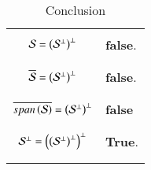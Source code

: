 \begin{longtable}{|c|l|}
    \hline
	\multirow{3}{*}{$\mathcal{S}=\left(\mathcal{S}^{\perp}\right)^{\perp}$} 
	& \\
	&\textbf{false}.\\
	&\\
	\hline
    \multirow{3}{*}{$\overline{\mathcal{S}}=\left(\mathcal{S}^{\perp}\right)^{\perp}$} 
	& \\
	&\textbf{false}.\\
	&\\
	\hline
	\multirow{3}{*}{$\overline{span\left(\mathcal{S}\right)}=\left(\mathcal{S}^{\perp}\right)^{\perp}$}
	&\\
	&\textbf{false}\\
	&\\
	\hline
	\multirow{3}{*}{$\mathcal{S}^{\perp}=\left(\left(\mathcal{S}^{\perp}\right)^{\perp}\right)^{\perp}$}
	& \\
    &\textbf{True}.\\
	&\\
	\hline
	\caption{Conclusion}
    \label{eq:solutions/2018/june/76/table:3}
\end{longtable}
